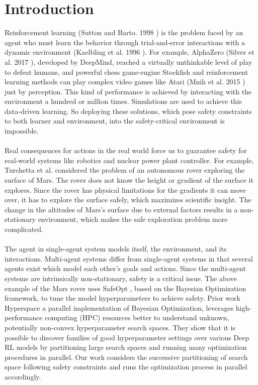 \chapter{Introduction}\label{ch:introduction}
Reinforcement learning (Sutton and Barto. 1998 \cite{Sutton1998}) is the problem faced by an agent who must learn the behavior through trial-and-error interactions with a dynamic environment (Kaelbling et al. 1996 \cite{Littman1996}).
For example, AlphaZero (Silver et al. 2017 \cite{silver2017mastering}), developed by DeepMind, reached a virtually unthinkable level of play to defeat humans, and powerful chess game-engine Stockfish and reinforcement learning methods can play complex video games like Atari (Mnih et al. 2015 \cite{mnih2015humanlevel}) just by perception. 
This kind of performance is achieved by interacting with the environment a hundred or million times. 
Simulations are used to achieve this data-driven learning. 
So deploying these solutions, which pose safety constraints to both learner and environment, into the safety-critical environment is impossible.\\
\\
Real consequences for actions in the real world force us to guarantee safety for real-world systems like robotics and nuclear power plant controller. 
For example, Turchetta et al.\cite{conf/nips/TurchettaB016} considered the problem of an autonomous rover exploring the surface of Mars. 
The rover does not know the height or gradient of the surface it explores. 
Since the rover has physical limitations for the gradients it can move over, it has to explore the surface safely, which maximizes scientific insight. 
The change in the altitudes of Mars's surface due to external factors results in a non-stationary environment, which makes the safe exploration problem more complicated.\\
\\
The agent in single-agent system models itself, the environment, and its interactions. 
Multi-agent systems differ from single-agent systems in that several agents exist which model each other's goals and actions. 
Since the multi-agent systems are intrinsically non-stationary, safety is a critical issue. 
The above example of the Mars rover uses SafeOpt \cite{conf/icml/SuiGBK15}, based on the Bayesian Optimization framework, to tune the model hyperparameters to achieve safety. 
Prior work Hyperspace \cite{conf/sbac-pad/YoungHRK18} a parallel implementation of Bayesian Optimization, leverages high-performance computing (HPC) resources better to understand unknown, potentially non-convex hyperparameter search spaces. 
They show that it is possible to discover families of good hyperparameter settings over various Deep RL models by partitioning large search spaces and running many optimization procedures in parallel. 
Our work considers the successive partitioning of search space following safety constraints and runs the optimization process in parallel accordingly.

